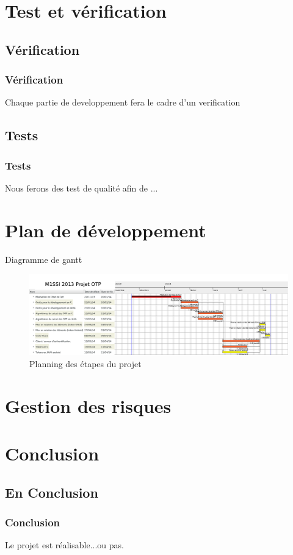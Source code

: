 \documentclass{beamer}
\begin{document}
\section{Test et vérification}

\subsection{Vérification}

\begin{frame}
  \frametitle{Vérification}
  Chaque partie de developpement fera le cadre d'un verification 
\end{frame}

\subsection{Tests}

\begin{frame}
  \frametitle{Tests}
  Nous ferons des test de qualité afin de ...
\end{frame}


\section{Plan de développement}
\begin{block}{Diagramme de gantt}
  \begin{figure}
    \includegraphics[scale=0.1]{img/gantt.png} %
    \caption{Planning des étapes du projet}
  \end{figure}
\end{block}

\section{Gestion des risques}


\section{Conclusion}

\subsection{En Conclusion}

\begin{frame}
\frametitle{Conclusion}
  Le projet est réalisable...ou pas.
\end{frame}



\end{document}

